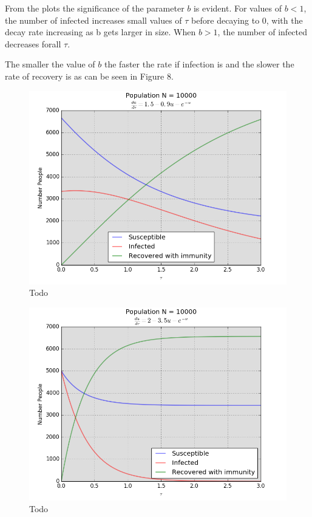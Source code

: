 \documentclass[a4paper]{article}
\begin{document}
From the plots the significance of the parameter $b$ is evident. For values of $b < 1$, the number of infected increases small values of $\tau$
before decaying to $0$, with the decay rate increasing as b gets larger in size. When $b > 1$, the number of infected decreases forall $\tau$.

The smaller the value of $b$ the faster the rate if infection is and the slower the rate of recovery is as can be seen in Figure 8.

\begin{figure}[H]
\centering
\includegraphics[width=1\textwidth]{q7_1.png}
\caption{\label{fig:data}Todo}
\end{figure}
\begin{figure}[H]
\centering
\includegraphics[width=1\textwidth]{q7_2.png}
\caption{\label{fig:data}Todo}
\end{figure}
\end{document}
